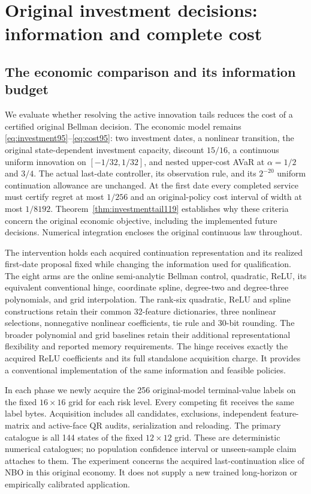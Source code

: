 \section{Original investment decisions: information and complete cost}
\label{sec:study119}

\subsection{The economic comparison and its information budget}
We evaluate whether resolving the active innovation tails reduces the cost of
a certified original Bellman decision.  The economic model remains
\eqref{eq:investment95}--\eqref{eq:cost95}: two investment dates, a nonlinear
transition, the original state-dependent investment capacity, discount
$15/16$, a continuous uniform innovation on $[-1/32,1/32]$, and nested
upper-cost AVaR at $\alpha=1/2$ and $3/4$.  The actual last-date controller,
its observation rule, and its $2^{-20}$ uniform continuation allowance are
unchanged.  At the first date every completed service must certify regret
at most $1/256$ and an original-policy cost interval of width at most
$1/8192$.  Theorem~\ref{thm:investmenttail119} establishes why these
criteria concern the original economic objective, including the implemented
future decisions.  Numerical integration encloses the original continuous
law throughout.

The intervention holds each acquired continuation representation and its
realized first-date proposal fixed while changing the information used for
qualification.  The eight arms are the online semi-analytic Bellman control,
quadratic, ReLU, its equivalent conventional hinge, coordinate spline,
degree-two and degree-three polynomials, and grid interpolation.  The
rank-six quadratic, ReLU and spline constructions retain their common
32-feature dictionaries, three nonlinear selections, nonnegative nonlinear
coefficients, tie rule and 30-bit rounding.  The broader polynomial and
grid baselines retain their additional representational flexibility and
reported memory requirements.  The hinge receives exactly the acquired
ReLU coefficients and its full standalone acquisition charge.  It provides
a conventional implementation of the same information and feasible policies.

In each phase we newly acquire the 256 original-model terminal-value labels
on the fixed $16\times16$ grid for each risk level.  Every competing fit
receives the same label bytes.  Acquisition includes all candidates,
exclusions, independent feature-matrix and active-face QR audits,
serialization and reloading.  The primary catalogue is all 144 states of
the fixed $12\times12$ grid.  These are deterministic numerical catalogues;
no population confidence interval or unseen-sample claim attaches to them.
The experiment concerns the acquired last-continuation slice of NBO in
this original economy.  It does not supply a new trained long-horizon or
empirically calibrated application.

